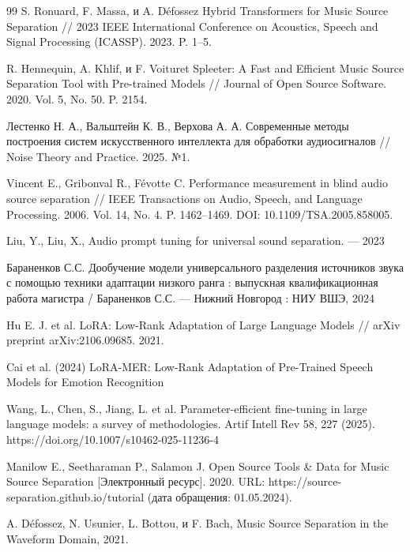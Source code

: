 \documentclass[14pt]{extarticle}
\begin{document}
\newpage
\renewcommand{\refname}{\rubibliographyname} %
{}%
\begin{thebibliography}{99}
	S. Ronuard, F. Massa, и A. Défossez Hybrid Transformers for Music Source Separation // 2023 IEEE International Conference on Acoustics, Speech and Signal Processing (ICASSP). 2023. P. 1–5.
	
	R. Hennequin, A. Khlif, и F. Voituret Spleeter: A Fast and Efficient Music Source Separation Tool with Pre-trained Models // Journal of Open Source Software. 2020. Vol. 5, No. 50. P. 2154.
	
	Лестенко Н. А., Вальштейн К. В., Верхова А. А. Современные методы построения систем искусственного интеллекта для обработки аудиосигналов // Noise Theory and Practice. 2025. №1.

	Vincent E., Gribonval R., Févotte C. Performance measurement in blind audio source separation // IEEE Transactions on Audio, Speech, and Language Processing. 2006. Vol. 14, No. 4. P. 1462–1469. DOI: 10.1109/TSA.2005.858005.

	Liu, Y., Liu, X., Audio prompt tuning for universal sound separation. --- 2023

	Бараненков С.С. Дообучение модели универсального разделения источников звука с помощью техники адаптации низкого ранга : выпускная квалификационная работа магистра / Бараненков С.С. — Нижний Новгород : НИУ ВШЭ, 2024

	Hu E. J. et al. LoRA: Low-Rank Adaptation of Large Language Models // arXiv preprint arXiv:2106.09685. 2021.

	Cai et al. (2024) LoRA-MER: Low-Rank Adaptation of Pre-Trained Speech Models for Emotion Recognition

	Wang, L., Chen, S., Jiang, L. et al. Parameter-efficient fine-tuning in large language models: a survey of methodologies. Artif Intell Rev 58, 227 (2025). https://doi.org/10.1007/s10462-025-11236-4

	Manilow E., Seetharaman P., Salamon J. Open Source Tools \& Data for Music Source Separation [Электронный ресурс]. 2020. URL: https://source-separation.github.io/tutorial (дата обращения: 01.05.2024).
	
	A. Défossez, N. Usunier, L. Bottou, и F. Bach, Music Source Separation in the Waveform Domain, 2021.
		

\end{thebibliography}
\end{document}
